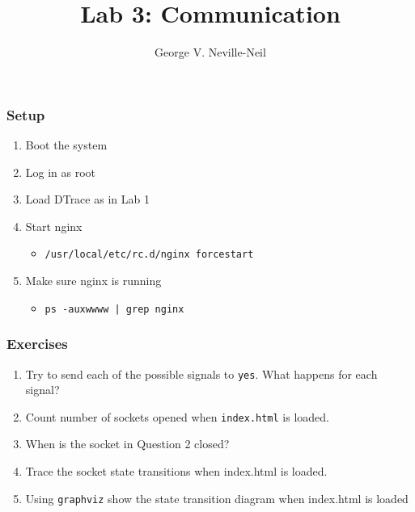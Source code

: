 \documentclass[pdftex]{beamer}
\begin{document}

\title{Lab 3: Communication}
\author[shortname]{George V. Neville-Neil}

\begin{frame}[fragile]
  \frametitle{Setup}
  \begin{enumerate}
  \item Boot the system
  \item Log in as root
  \item Load DTrace as in Lab 1
  \item Start nginx
    \begin{itemize}
    \item \verb|/usr/local/etc/rc.d/nginx forcestart|
    \end{itemize}
  \item Make sure nginx is running
    \begin{itemize}
    \item \verb+ps -auxwwww | grep nginx+
    \end{itemize}
  \end{enumerate}
\end{frame}

\begin{frame}[fragile]
  \frametitle{Exercises}
  \begin{enumerate}
  \item Try to send each of the possible signals to \verb|yes|.  What happens
    for each signal?
  \item Count number of sockets opened when \verb|index.html| is loaded.
  \item When is the socket in Question 2 closed?
  \item Trace the socket state transitions when index.html is loaded.
  \item Using \texttt{graphviz} show the state transition diagram when
    index.html is loaded
  \end{enumerate}
\end{frame}
\end{document}
